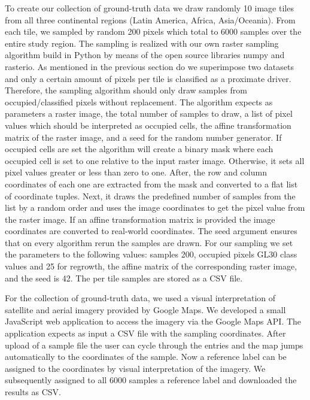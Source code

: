 			To create our collection of ground-truth data we draw randomly 10 image tiles from all three continental regions (Latin America, Africa, Asia/Oceania). From each tile, we sampled by random 200 pixels which total to 6000 samples over the entire study region. The sampling is realized with our own raster sampling algorithm build in Python by means of the open source libraries numpy and rasterio. As mentioned in the previous section do we superimpose two datasets and only a certain amount of pixels per tile is classified as a proximate driver. Therefore, the sampling algorithm should only draw samples from occupied/classified pixels without replacement. The algorithm expects as parameters a raster image, the total number of samples to draw, a list of pixel values which should be interpreted as occupied cells, the affine transformation matrix of the raster image, and a seed for the random number generator. If occupied cells are set the algorithm will create a binary mask where each occupied cell is set to one relative to the input raster image. Otherwise, it sets all pixel values greater or less than zero to one. After, the row and column coordinates of each one are extracted from the mask and converted to a flat list of coordinate tuples. Next, it draws the predefined number of samples from the list by a random order and uses the image coordinates to get the pixel value from the raster image. If an affine transformation matrix is provided the image coordinates are converted to real-world coordinates. The seed argument ensures that on every algorithm rerun the samples are drawn. For our sampling we set the parameters to the following values: samples 200, occupied pixels \ac{GL30} class values and 25 for regrowth, the affine matrix of the corresponding raster image, and the seed is 42. The per tile samples are stored as a \ac{CSV} file.

			For the collection of ground-truth data, we used a visual interpretation of satellite and aerial imagery provided by Google Maps. We developed a small JavaScript web application to access the imagery via the Google Maps \ac{API}. The application expects as input a \ac{CSV} file with the sampling coordinates. After upload of a sample file the user can cycle through the entries and the map jumps automatically to the coordinates of the sample. Now a reference label can be assigned to the coordinates by visual interpretation of the imagery. We subsequently assigned to all 6000 samples a reference label and downloaded the results as \ac{CSV}.

